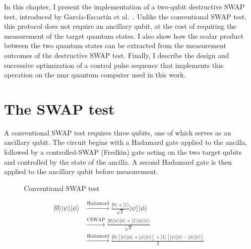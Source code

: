 In this chapter, I present the implementation of a two-qubit destructive SWAP test, introduced by García-Escartín et al.~\cite{Garcia_Escartin_2013}. Unlike the conventional SWAP test, this protocol does not require an ancillary qubit, at the cost of requiring the measurement of the target quantum states. I also show how the scalar product between the two quantum states can be extracted from the measurement outcomes of the destructive SWAP test. Finally, I describe the design and successive optimization of a control pulse sequence that implements this operation on the \acs{nmr} quantum computer used in this work.

\section{The SWAP test}
\label{sec:swaptest}

A conventional SWAP test requires three qubits, one of which serves as an ancillary qubit. The circuit begins with a Hadamard gate applied to the ancilla, followed by a controlled-SWAP (Fredkin) gate acting on the two target qubits and controlled by the state of the ancilla. A second Hadamard gate is then applied to the ancillary qubit before measurement.

\begin{figure}[h]
\centering
{}
\caption{Conventional SWAP test}
\end{figure}


\begin{equation}
\begin{aligned}
    |0\rangle |\psi\rangle |\phi\rangle &\xrightarrow{\mathrm{Hadamard}}\frac{|0\rangle+|1\rangle}{\sqrt{2}}|\psi\rangle |\phi\rangle\\&\xrightarrow{\mathrm{CSWAP}}\frac{|0\rangle|\psi\rangle|\phi\rangle+|1\rangle|\phi\rangle|\psi\rangle}{\sqrt{2}}\\&\xrightarrow{\mathrm{Hadamard}}\frac{|0\rangle[|\psi\rangle|\phi\rangle+|\phi\rangle|\psi\rangle]+|1\rangle[|\psi\rangle|\phi\rangle-|\phi\rangle|\psi\rangle]}{2}
\end{aligned}
\end{equation}

